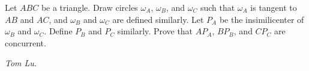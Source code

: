 Let $ABC$ be a triangle. Draw circles $\omega_A$, $\omega_B$, and $\omega_C$ such that $\omega_A$ is tangent to $AB$ and $AC$, and $\omega_B$ and $\omega_C$ are defined similarly. Let $P_A$ be the insimilicenter of $\omega_B$ and $\omega_C$. Define $P_B$ and $P_C$ similarly. Prove that $AP_A$, $BP_B$, and $CP_C$ are concurrent.

\textit{Tom Lu.}